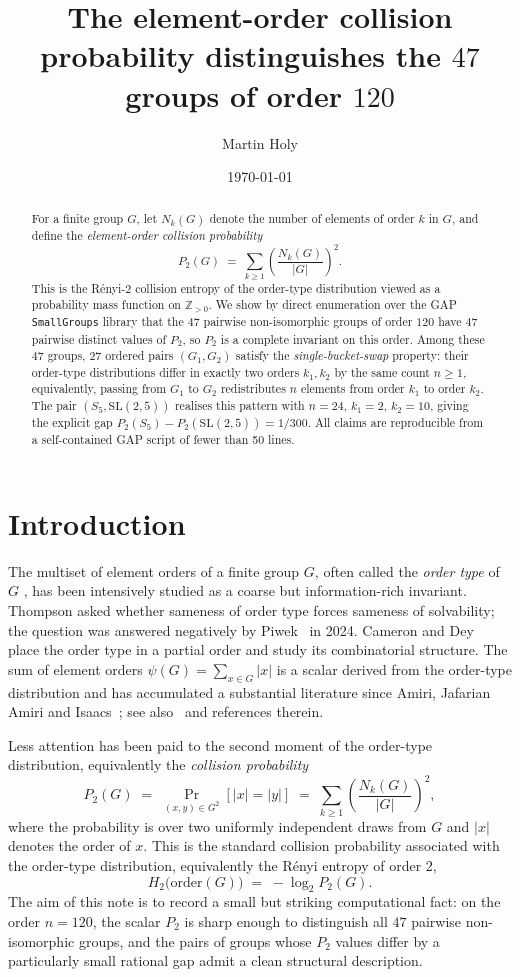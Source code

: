 \documentclass[11pt]{amsart}
\title{The element-order collision probability distinguishes the $47$ groups of order $120$}
\author{Martin Holy}
\date{\today}
\theoremstyle{plain}
\theoremstyle{definition}
\begin{document}
\begin{abstract}
For a finite group $G$, let $N_k(G)$ denote the number of elements of order $k$ in $G$, and define the \emph{element-order collision probability}
\[
  P_2(G) \;=\; \sum_{k \geq 1} \left(\frac{N_k(G)}{|G|}\right)^2.
\]
This is the R\'{e}nyi-$2$ collision entropy of the order-type distribution viewed as a probability mass function on $\mathbb{Z}_{>0}$.
We show by direct enumeration over the GAP \texttt{SmallGroups} library that the $47$ pairwise non-isomorphic groups of order $120$ have $47$ pairwise distinct values of $P_2$, so $P_2$ is a complete invariant on this order. Among these $47$ groups, $27$ ordered pairs $(G_1, G_2)$ satisfy the \emph{single-bucket-swap} property: their order-type distributions differ in exactly two orders $k_1, k_2$ by the same count $n \geq 1$, equivalently, passing from $G_1$ to $G_2$ redistributes $n$ elements from order $k_1$ to order $k_2$. The pair $(S_5, \mathrm{SL}(2,5))$ realises this pattern with $n=24$, $k_1=2$, $k_2=10$, giving the explicit gap $P_2(S_5) - P_2(\mathrm{SL}(2,5)) = 1/300$. All claims are reproducible from a self-contained GAP script of fewer than 50 lines.
\end{abstract}

\maketitle

\section{Introduction}

The multiset of element orders of a finite group $G$, often called the \emph{order type} of $G$ \cite{Thompson1987}, has been intensively studied as a coarse but information-rich invariant. Thompson asked whether sameness of order type forces sameness of solvability; the question was answered negatively by Piwek~\cite{Piwek2024} in 2024. Cameron and Dey~\cite{CameronDey2023} place the order type in a partial order and study its combinatorial structure. The sum of element orders $\psi(G) = \sum_{x \in G} |x|$ is a scalar derived from the order-type distribution and has accumulated a substantial literature since Amiri, Jafarian Amiri and Isaacs~\cite{AmiriAmiriIsaacs2009}; see also~\cite{HerzogLongobardiMaj2018} and references therein.

Less attention has been paid to the second moment of the order-type distribution, equivalently the \emph{collision probability}
\[
  P_2(G) \;=\; \Pr_{(x,y) \in G^2}[|x| = |y|] \;=\; \sum_{k \geq 1} \left(\frac{N_k(G)}{|G|}\right)^2,
\]
where the probability is over two uniformly independent draws from $G$ and $|x|$ denotes the order of $x$. This is the standard collision probability associated with the order-type distribution, equivalently the R\'{e}nyi entropy of order $2$,
\[
  H_2\big(\mathrm{order}(G)\big) \;=\; -\log_2 P_2(G).
\]
The aim of this note is to record a small but striking computational fact: on the order $n = 120$, the scalar $P_2$ is sharp enough to distinguish all $47$ pairwise non-isomorphic groups, and the pairs of groups whose $P_2$ values differ by a particularly small rational gap admit a clean structural description.
\end{document}
